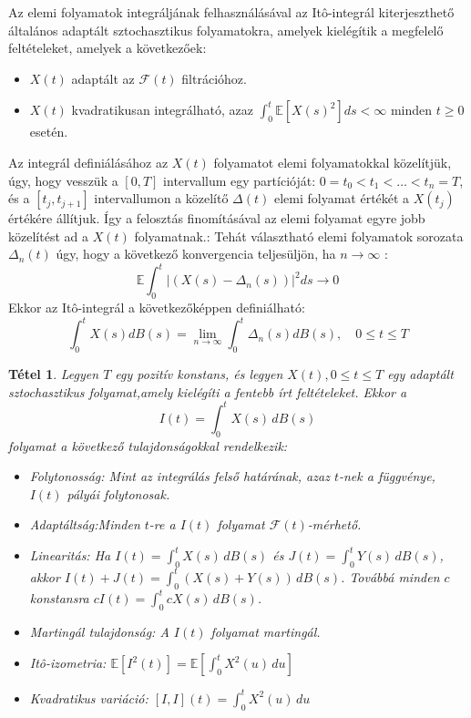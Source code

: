 \documentclass[12pt, a4paper]{article}
\newtheorem{theorem}{Tétel}[subsection]
\begin{document}
Az elemi folyamatok integráljának felhasználásával az Itô-integrál kiterjeszthető általános adaptált sztochasztikus folyamatokra, amelyek kielégítik a megfelelő feltételeket, amelyek a következőek:
\begin{itemize}
    \item $X(t)$ adaptált az $\mathcal{F}(t)$ filtrációhoz.
    \item $X(t)$ kvadratikusan integrálható, azaz $\int_0^t \mathbb{E}[X(s)^2] ds < \infty$ minden $t \ge 0$ esetén.
\end{itemize}

Az integrál definiálásához az $X(t)$ folyamatot elemi folyamatokkal közelítjük, úgy, hogy vesszük a $[0,T]$ intervallum egy partícióját: $0 = t_0 < t_1 < \dots < t_n = T$, és a $[t_j, t_{j+1}]$ intervallumon a közelítő $\Delta(t)$ elemi folyamat értékét a $X(t_j)$ értékére állítjuk. Így a felosztás finomításával az elemi folyamat egyre jobb közelítést ad a $X(t)$ folyamatnak.:
Tehát választható elemi folyamatok sorozata $\Delta_n(t)$ úgy, hogy a következő konvergencia teljesüljön, ha $n \to \infty$ :
\[
\mathbb{E} \int_0^t |(X(s) - \Delta_n(s))|^2 ds \to 0
\]
Ekkor az Itô-integrál a következőképpen definiálható:
\[
\int_0^t X(s) dB(s) = \lim_{n \to \infty} \int_0^t \Delta_n(s) dB(s), \quad 0\le t \le T
\]

\begin{theorem}\label{thm_ito_integral_properties}
\cite{shreve2004} Legyen $T$ egy pozitív konstans, és legyen $X(t), 0 \leq t \leq T$ egy adaptált sztochasztikus folyamat,amely kielégíti a fentebb írt feltételeket. Ekkor a
\[
I(t)=\int_0^t X(s)\,dB(s)
\]
folyamat a következő tulajdonságokkal rendelkezik:
\begin{itemize}
    \item Folytonosság: Mint az integrálás felső határának, azaz $t$-nek a függvénye,$I(t)$ pályái folytonosak.
    \item Adaptáltság:Minden $t$-re a $I(t)$ folyamat $\mathcal{F}(t)$-mérhető.
    \item Linearitás: Ha $I(t)=\int_0^t X(s)\,dB(s)$ és $J(t)=\int_0^t Y(s)\,dB(s)$, akkor $I(t)+J(t)=\int_0^t (X(s)+Y(s))\,dB(s)$. Továbbá minden $c$ konstansra $cI(t)=\int_0^t cX(s)\,dB(s)$.
    \item Martingál tulajdonság: A $I(t)$ folyamat martingál.
    \item Itô-izometria: $\mathbb{E}[I^2(t)] = \mathbb{E}\left[\int_0^t X^2(u)\,du\right]$
    \item Kvadratikus variáció: $[I,I](t)=\int_0^t X^2(u)\,du$
\end{itemize}
\end{theorem}
\end{document}
